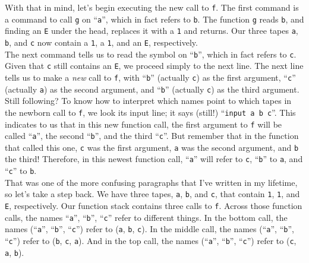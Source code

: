 \documentclass[11pt]{article}
\begin{document}
With that in mind, let's begin executing the new call to \texttt{f}. The first command is a command to call \texttt{g} on ``\texttt{a}'', which in fact refers to \texttt{b}. The function \texttt{g} reads \texttt{b}, and finding an \texttt{E} under the head, replaces it with a \texttt{1} and returns. Our three tapes \texttt{a}, \texttt{b}, and \texttt{c} now contain a \texttt{1}, a \texttt{1}, and an \texttt{E}, respectively. \\

The next command tells us to read the symbol on ``\texttt{b}'', which in fact refers to \texttt{c}. Given that \texttt{c} still contains an \texttt{E}, we proceed simply to the next line. The next line tells us to make a \emph{new} call to \texttt{f}, with ``\texttt{b}'' (actually \texttt{c}) as the first argument, ``\texttt{c}'' (actually \texttt{a}) as the second argument, and ``\texttt{b}'' (actually \texttt{c}) as the third argument. \\

Still following? To know how to interpret which names point to which tapes in the newborn call to \texttt{f}, we look its input line; it says (still!) ``\texttt{input a b c}''. This indicates to us that in this new function call, the first argument to \texttt{f} will be called ``\texttt{a}'', the second ``\texttt{b}'', and the third ``\texttt{c}''. But remember that in the function that called this one, \texttt{c} was the first argument, \texttt{a} was the second argument, and \texttt{b} the third! Therefore, in this newest function call, ``\texttt{a}'' will refer to \texttt{c}, ``\texttt{b}'' to \texttt{a}, and ``\texttt{c}'' to \texttt{b}. \\

That was one of the more confusing paragraphs that I've written in my lifetime, so let's take a step back. We have three tapes, \texttt{a}, \texttt{b}, and \texttt{c}, that contain \texttt{1}, \texttt{1}, and \texttt{E}, respectively. Our function stack contains three calls to \texttt{f}. Across those function calls, the names ``\texttt{a}'', ``\texttt{b}'', ``\texttt{c}'' refer to different things. In the bottom call, the names (``\texttt{a}'', ``\texttt{b}'', ``\texttt{c}'') refer to (\texttt{a}, \texttt{b}, \texttt{c}). In the middle call, the names (``\texttt{a}'', ``\texttt{b}'', ``\texttt{c}'') refer to (\texttt{b}, \texttt{c}, \texttt{a}). And in the top call, the names (``\texttt{a}'', ``\texttt{b}'', ``\texttt{c}'') refer to (\texttt{c}, \texttt{a}, \texttt{b}). \\
\end{document}
